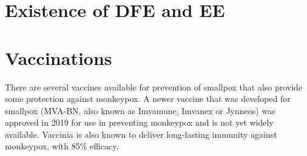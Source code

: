 \section{Existence of DFE and EE}


\section{Vaccinations}
There are several vaccines available for prevention of smallpox that also provide some protection against monkeypox. A newer vaccine that was developed for smallpox (MVA-BN, also known as Imvamune, Imvanex or Jynneos) was approved in 2019 for use in preventing monkeypox and is not yet widely available. Vaccinia is also known to deliver long-lasting immunity against
monkeypox, with 85\% efficacy.